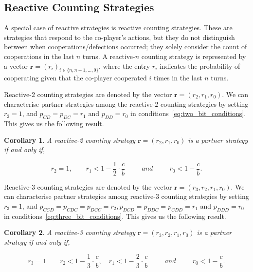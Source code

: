 \documentclass[11pt]{article}
\theoremstyle{plainCl1}
\newtheorem{corollary}{Corollary}[theorem]
\theoremstyle{plainCl2}
\begin{document}
\subsection{Reactive Counting Strategies}

A special case of reactive strategies is reactive counting strategies. These are
strategies that respond to the co-player's actions, but they do not distinguish
between when cooperations/defections occurred; they solely consider the count of
cooperations in the last $n$ turns. A reactive-$n$ counting strategy is represented
by a vector $\mathbf{r}=(r_i)_{i \in \{n, n -1, \dots, 0\}}$, where the entry \(r_i\)
indicates the probability of cooperating given that the co-player cooperated
\(i\) times in the last \(n\) turns.

Reactive-2 counting strategies are denoted by the vector $\mathbf{r}=(r_2,
r_1, r_0)$. We can characterise partner strategies among the reactive-2
counting strategies by setting $r_2 = 1$, and $p_{CD} = p_{DC} = r_1$ and
$p_{DD} = r_0$ in conditions~\eqref{eq:two_bit_conditions}. This gives us the
following result.

\begin{corollary}
A reactive-2 counting strategy $\mathbf{r} = (r_2, r_1, r_0)$ is a partner strategy if and only if,

\begin{equation}\label{eq:counting_two_bit_conditions}
  \displaystyle r_2 = 1, \qquad r_1 < 1-\frac{1}{2} \cdot \frac{c}{b} \qquad ~~and~~ \qquad r_0 < 1\!-\! \frac{c}{b}.
\end{equation}
\end{corollary}

Reactive-3 counting strategies are denoted by the vector $\mathbf{r}=(r_3,
r_2, r_1, r_0)$. We can characterise partner strategies among reactive-3
counting strategies by setting $r_3 = 1$, and $p_{CCD} = p_{CDC} = p_{DCC} =
r_2, p_{DCD} = p_{DDC} = p_{CDD} = r_1$ and $p_{DDD} = r_0$ in
conditions~\eqref{eq:three_bit_conditions}. This gives us the following result.

\begin{corollary}
A reactive-3 counting strategy $\mathbf{r} = (r_3, r_2, r_1, r_0)$ is a partner strategy if and only if,

\begin{equation}\label{eq:counting_three_bit_conditions}
  \displaystyle r_3 = 1 \qquad r_2 < 1- \frac{1}{3} \cdot \frac{c}{b}, \quad r_1 < 1- \frac{2}{3} \cdot \frac{c}{b} \qquad ~~and~~ \qquad r_0 < 1\!-\! \frac{c}{b}.
\end{equation}
\end{corollary}
\end{document}

